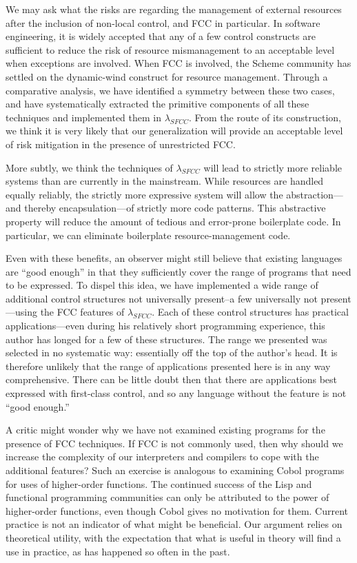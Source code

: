 \documentclass[11pt]{article}
\begin{document}
We may ask what the risks are regarding the management of external resources after the inclusion of non-local control, and FCC in particular.
In software engineering, it is widely accepted that any of a few control constructs are sufficient to reduce the risk of resource mismanagement to an acceptable level when exceptions are involved.
When FCC is involved, the Scheme community has settled on the dynamic-wind construct for resource management.
Through a comparative analysis, we have identified a symmetry between  these two cases, and have systematically extracted the primitive components of all these techniques and implemented them in $\lambda_{SFCC}$.
From the route of its construction, we think it is very likely that our generalization will provide an acceptable level of risk mitigation in the presence of unrestricted FCC.

More subtly, we think the techniques of $\lambda_{SFCC}$ will lead to strictly more reliable systems than are currently in the mainstream.
While resources are handled equally reliably, the strictly more expressive system will allow the abstraction---and thereby encapsulation---of strictly more code patterns.
This abstractive property will reduce the amount of tedious and error-prone boilerplate code.
In particular, we can eliminate boilerplate resource-management code.

Even with these benefits, an observer might still believe that existing languages are ``good enough'' in that they sufficiently cover the range of programs that need to be expressed.
To dispel this idea, we have implemented a wide range of additional control structures not universally present--a few universally not present---using the FCC features of $\lambda_{SFCC}$.
Each of these control structures has practical applications---even during his relatively short programming experience, this author has longed for a few of these structures.
The range we presented was selected in no systematic way: essentially off the top of the author's head.
It is therefore unlikely that the range of applications presented here is in any way comprehensive.
There can be little doubt then that there are applications best expressed with first-class control, and so any language without the feature is not ``good enough.''

A critic might wonder why we have not examined existing programs for the presence of FCC techniques.
If FCC is not commonly used, then why should we increase the complexity of our interpreters and compilers to cope with the additional features?
Such an exercise is analogous to examining Cobol programs for uses of higher-order functions.
The continued success of the Lisp and functional programming communities can only be attributed to the power of higher-order functions, even though Cobol gives no motivation for them.
Current practice is not an indicator of what might be beneficial.
Our argument relies on theoretical utility, with the expectation that what is useful in theory will find a use in practice, as has happened so often in the past.
\end{document}
